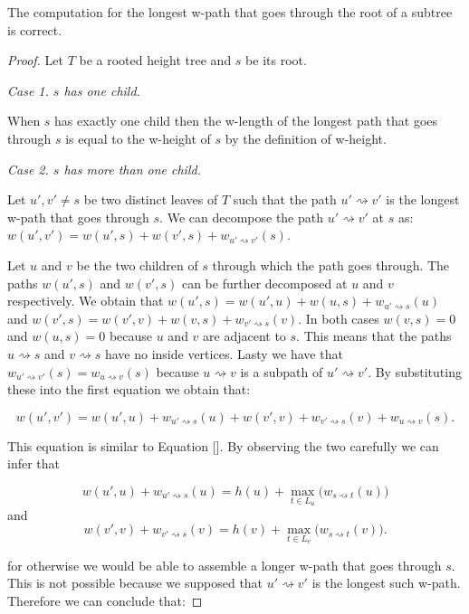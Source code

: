 \begin{lem} The computation for the longest w-path that goes through the root of a subtree is correct. \end{lem}
\begin{proof}

    Let $T$ be a rooted height tree and $s$ be its root.

    \em Case 1. $s$ has one child. \em

    When $s$ has exactly one child then the w-length of the longest path that goes through $s$ is equal to the w-height of $s$ by the definition of w-height.

    \em Case 2. $s$ has more than one child. \em

    Let $u', v' \ne s$ be two distinct leaves of $T$ such that the path $u' \rightsquigarrow v'$ is the longest w-path that goes through $s$.
    We can decompose the path $u' \rightsquigarrow v'$ at $s$ as: $w(u', v') = w(u', s) + w(v', s) + w_{u' \rightsquigarrow v'}(s)$.

    Let $u$ and $v$ be the two children of $s$ through which the path goes through.
    The paths $w(u', s)$ and $w(v', s)$ can be further decomposed at $u$ and $v$ respectively. We obtain that
    $w(u', s) = w(u', u) + w(u, s) + w_{u' \rightsquigarrow s}(u)$ and
    $w(v', s) = w(v', v) + w(v, s) + w_{v' \rightsquigarrow s}(v)$.
    In both cases $w(v, s) = 0$ and $w(u, s) = 0$ because $u$ and $v$ are adjacent to $s$. This means that the paths $u \rightsquigarrow s$ and $v \rightsquigarrow s$ have no inside vertices.
    Lasty we have that $w_{u' \rightsquigarrow v'}(s) = w_{u \rightsquigarrow v}(s)$ because $u \rightsquigarrow v$ is a subpath of $u' \rightsquigarrow v'$.
    By substituting these into the first equation we obtain that:

    $$w(u', v') = w(u', u) + w_{u' \rightsquigarrow s}(u) + w(v', v) + w_{v' \rightsquigarrow s}(v) + w_{u \rightsquigarrow v}(s). $$

    This equation is similar to Equation []. By observing the two carefully we can infer that

    $$w(u', u) + w_{u' \rightsquigarrow s}(u) = h(u) + \max\limits_{t \in L_u}\Big(w_{s \rightsquigarrow t}(u)\Big)$$
    and
    $$w(v', v) + w_{v' \rightsquigarrow s}(v) = h(v) + \max\limits_{t \in L_v}\Big(w_{s \rightsquigarrow t}(v)\Big).$$

    for otherwise we would be able to assemble a longer w-path that goes through $s$. This is not possible because we supposed that $u' \rightsquigarrow v'$ is the longest such w-path. Therefore we can conclude that:


\end{proof}
